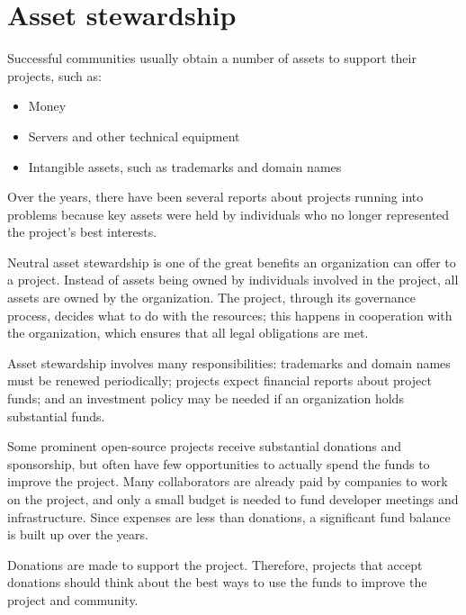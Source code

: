 


\chapter{Asset stewardship}

Successful communities usually obtain a number of assets to support their projects, such as:

\begin{itemize}

\item Money

\item Servers and other technical equipment

\item Intangible assets, such as trademarks and domain names

\end{itemize}

Over the years, there have been several reports about projects running into problems because key assets were held by individuals who no longer represented the project's best interests.

Neutral asset stewardship is one of the great benefits an organization can offer to a project.  Instead of assets being owned by individuals involved in the project, all assets are owned by the organization.  The project, through its governance process, decides what to do with the resources; this happens in cooperation with the organization, which ensures that all legal obligations are met.

Asset stewardship involves many responsibilities: trademarks and domain names must be renewed periodically; projects expect financial reports about project funds; and an investment policy may be needed if an organization holds substantial funds.

\begin{kaobox}[frametitle=Projects with big balances]

Some prominent open-source projects receive substantial donations and sponsorship, but often have few opportunities to actually spend the funds to improve the project.  Many collaborators are already paid by companies to work on the project, and only a small budget is needed to fund developer meetings and infrastructure.  Since expenses are less than donations, a significant fund balance is built up over the years.

Donations are made to support the project.  Therefore, projects that accept donations should think about the best ways to use the funds to improve the project and community.

\end{kaobox}

